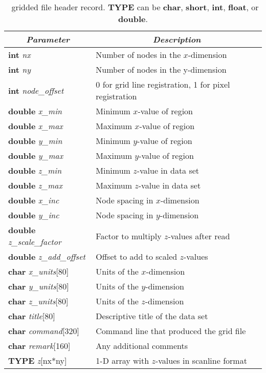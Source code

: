 \begin{table}
\centering
\begin{tabular}{|l|l|} \hline
\multicolumn{1}{|c}{\emph{Parameter}}   &       \multicolumn{1}{|c|}{\emph{Description}}        \\ \hline
\textbf{int} \emph{nx}                      &       Number of nodes in the $x$-dimension    \\ \hline
\textbf{int} \emph{ny}                      &       Number of nodes in the y-dimension      \\ \hline
\textbf{int} \emph{node\_offset}    &       0 for grid line registration, 1 for pixel registration  \\ \hline
\textbf{double} \emph{x\_min}               &       Minimum $x$-value of region     \\ \hline
\textbf{double} \emph{x\_max}               &       Maximum $x$-value of region  \\ \hline
\textbf{double} \emph{y\_min}               &       Minimum $y$-value of region  \\ \hline
\textbf{double} \emph{y\_max}               &       Maximum $y$-value of region  \\ \hline
\textbf{double} \emph{z\_min}               &       Minimum $z$-value in data set  \\ \hline
\textbf{double} \emph{z\_max}               &       Maximum $z$-value in data set  \\ \hline
\textbf{double} \emph{x\_inc}               &       Node spacing in $x$-dimension  \\ \hline
\textbf{double} \emph{y\_inc}               &       Node spacing in $y$-dimension  \\ \hline
\textbf{double} \emph{z\_scale\_factor}     &       Factor to multiply $z$-values after read  \\ \hline
\textbf{double} \emph{z\_add\_offset}       &       Offset to add to scaled $z$-values  \\ \hline
\textbf{char} \emph{x\_units}[80]   &       Units of the $x$-dimension      \\ \hline
\textbf{char} \emph{y\_units}[80]   &       Units of the $y$-dimension      \\ \hline
\textbf{char} \emph{z\_units}[80]   &       Units of the $z$-dimension      \\ \hline 
\textbf{char} \emph{title}[80]      &       Descriptive title of the data set       \\ \hline
\textbf{char} \emph{command}[320]   &       Command line that produced the grid file  \\ \hline
\textbf{char} \emph{remark}[160]    &       Any additional comments \\ \hline \hline
\textbf{TYPE} \emph{z}[nx*ny]      &       1-D array with $z$-values in scanline format \\ \hline
\end{tabular}
\caption{\gmt\ gridded file header record. \textbf{TYPE} can be \textbf{char}, \textbf{short}, \textbf{int},
\textbf{float}, or {\bf
double}.}
\label{tbl:grdheader}
\end{table}

